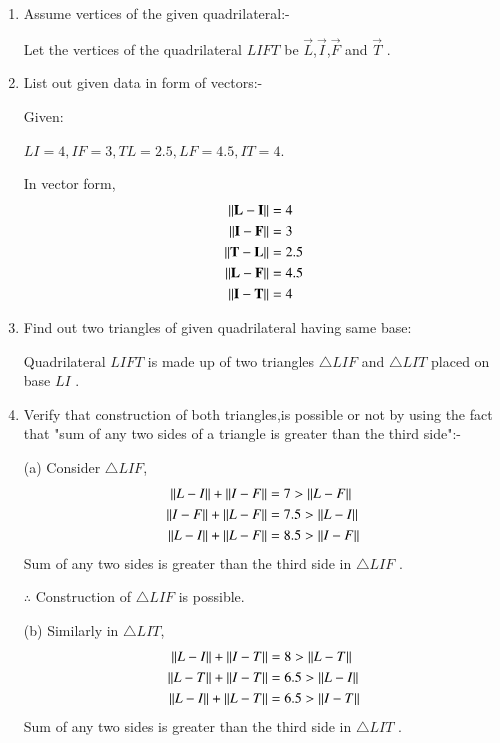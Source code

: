 \documentclass[journal,12pt,twocolumn]{IEEEtran}
\begin{document}
\begin{enumerate}
    \item Assume vertices of the given quadrilateral:-
    
    Let the vertices of the quadrilateral $LIFT$ be $\vec{L}$,$\vec{I}$,$\vec{F}$ and $\vec{T}$ .
    
    \item List out given data in form of vectors:-
    
    Given:
    
    $LI=4,IF=3,TL=2.5,LF=4.5,IT=4$.
    
    In vector form,
    \begin{align}
    \left\lVert\mathbf{L}-\mathbf{I}\right\rVert &= 4
    \\
    \left\lVert\mathbf{I}-\mathbf{F}\right\rVert &= 3
    \\
    \left\lVert\mathbf{T}-\mathbf{L}\right\rVert &= 2.5
    \\
    \left\lVert\mathbf{L}-\mathbf{F}\right\rVert &= 4.5
    \\
    \left\lVert\mathbf{I}-\mathbf{T}\right\rVert &= 4
    \end{align}
    
    \item Find out two triangles of given quadrilateral having same base:
    
    Quadrilateral $LIFT$ is made up of two triangles $\triangle LIF$ and $\triangle LIT$ placed on base $LI$ .
    
\item Verify that construction of both triangles,is possible or not by using the fact that "sum of any two sides of a triangle is greater than the third side":-
   \item[(a)]
Consider $\triangle LIF$,
\begin{align}
    \left\lVert L-I\right\rVert+\left\lVert I-F\right\rVert &=7 >\left\lVert L-F\right\rVert\\
    \left\lVert I-F\right\rVert+\left\lVert L-F\right\rVert &=7.5 >\left\lVert L-I\right\rVert\\
    \left\lVert L-I\right\rVert+\left\lVert L-F\right\rVert &=8.5 >\left\lVert I-F\right\rVert
\end{align}
Sum of any two sides is greater than the third side in $\triangle LIF$ .

 $\therefore$ Construction of $\triangle LIF$ is possible.
\item[(b)]
Similarly in $\triangle LIT$,
\begin{align}
    \left\lVert L-I\right\rVert+\left\lVert I-T\right\rVert &=8 >\left\lVert L-T\right\rVert\\
     \left\lVert L-T\right\rVert+\left\lVert I-T\right\rVert &=6.5 >\left\lVert L-I\right\rVert\\
    \left\lVert L-I\right\rVert+\left\lVert L-T\right\rVert &=6.5 >\left\lVert I-T\right\rVert
\end{align}
Sum of any two sides is greater than the third side in $\triangle LIT$ .


\end{enumerate}
\end{document}
